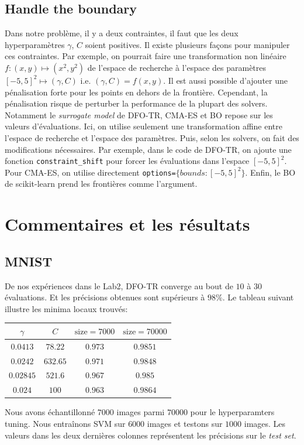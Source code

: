 \documentclass[12 pt, a4paper]{article}
\begin{document}
\subsection{Handle the boundary}
Dans notre problème, il y a deux contraintes, il faut que les deux hyperparamètres $\gamma$, $C$ soient positives. Il existe plusieurs façons pour manipuler ces contraintes. Par exemple, on pourrait faire une transformation non linéaire $f:(x,y) \mapsto (x^2, y^2)$ de l'espace de recherche à l'espace des paramètres $[-5, 5]^2 \mapsto (\gamma, C)$ i.e. $(\gamma, C) = f(x,y)$. Il est aussi possible d'ajouter une pénalisation forte pour les points en dehors de la frontière. Cependant, la pénalisation risque de perturber la performance de la plupart des solvers. Notamment le \textit{surrogate model} de DFO-TR, CMA-ES et BO repose sur les valeurs d'évaluations. Ici, on utilise seulement une transformation affine entre l'espace de recherche et l'espace des paramètres. Puis, selon les solvers, on fait des modifications nécessaires. Par exemple, dans le code de DFO-TR, on ajoute une fonction \texttt{constraint\_shift} pour forcer les évaluations dans l'espace $[-5,5]^2$. Pour CMA-ES, on utilise directement \texttt{options=$\{bounds: [-5,5]^2\}$}. Enfin, le BO de scikit-learn prend les frontières comme l'argument.







\section{Commentaires et les résultats}\label{results}

\subsection{MNIST}

De nos expériences dans le Lab2, DFO-TR converge au bout de $10$ à $30$ évaluations. Et les précisions obtenues sont supérieurs à $98\%$. Le tableau suivant illustre les minima locaux trouvés:

\begin{center}
\begin{tabular}{|c|c|c|c|}
  \hline
  $\gamma$ & $C$ & $\text{size}=7000$ & $\text{size}=70000$ \\
  \hline
  $0.0413$ & $78.22$ & $0.973$ & $0.9851$ \\
  $0.0242$ & $632.65$ & $0.971$ & $0.9848$ \\
  $0.02845$ & $521.6$ & $0.967$ & $0.985$ \\
  $0.024$ & $100$ & $0.963$ & $0.9864$ \\
  \hline
\end{tabular}
\end{center}
Nous avons échantillonné $7000$ images parmi $70000$ pour le hyperparamters tuning. Nous entraînons SVM sur $6000$ images et testons sur $1000$ images. Les valeurs dans les deux dernières colonnes représentent les précisions sur le \emph{test set}.
\end{document}
